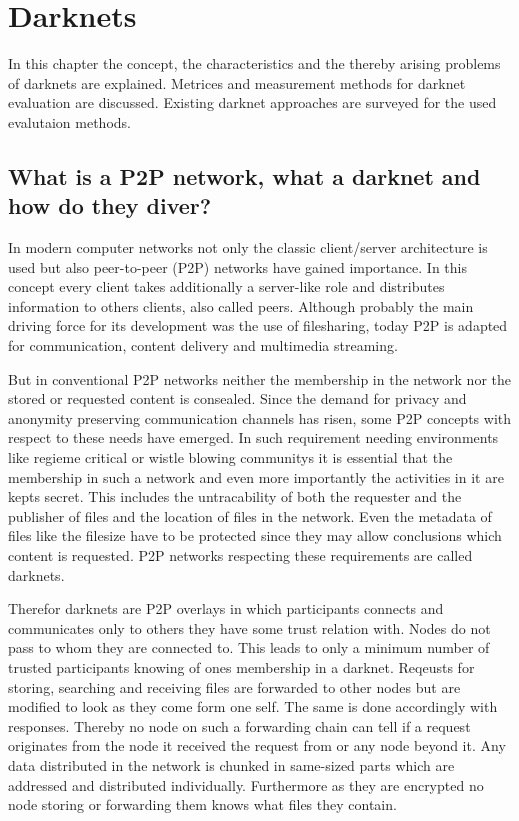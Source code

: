 \chapter{Darknets}

In this chapter the concept, the characteristics and the thereby arising problems of darknets are explained. Metrices and measurement methods for darknet evaluation are discussed. Existing darknet approaches are surveyed for the used evalutaion methods. 

\section{What is a P2P network, what a darknet and how do they diver?}

In modern computer networks not only the classic client/server architecture is used but also peer-to-peer (P2P) networks have gained importance. In this concept every client takes additionally a server-like role and distributes information to others clients, also called peers. Although probably the main driving force for its development was the use of filesharing, today P2P is adapted for communication, content delivery and multimedia streaming.

But in conventional P2P networks neither the membership in the network nor the stored or requested content is consealed. Since the demand for privacy and anonymity preserving communication channels has risen, some P2P concepts with respect to these needs have emerged. In such requirement needing environments like regieme critical or wistle blowing communitys it is essential that the membership in such a network and even more importantly the activities in it are kepts secret. This includes the untracability of both the requester and the publisher of files and the location of files in the network. Even the metadata of files like the filesize have to be protected since they may allow conclusions which content is requested. P2P networks respecting these requirements are called darknets.

Therefor darknets are P2P overlays in which participants connects and communicates only to others they have some trust relation with. Nodes do not pass to whom they are connected to. This leads to only a minimum number of trusted participants knowing of ones membership in a darknet. Reqeusts for storing, searching and receiving files are forwarded to other nodes but are modified to look as they come form one self. The same is done accordingly with responses. Thereby no node on such a forwarding chain can tell if a request originates from the node it received the request from or any node beyond it. Any data distributed in the network is chunked in same-sized parts which are addressed and distributed individually. Furthermore as they are encrypted no node storing or forwarding them knows what files they contain.


